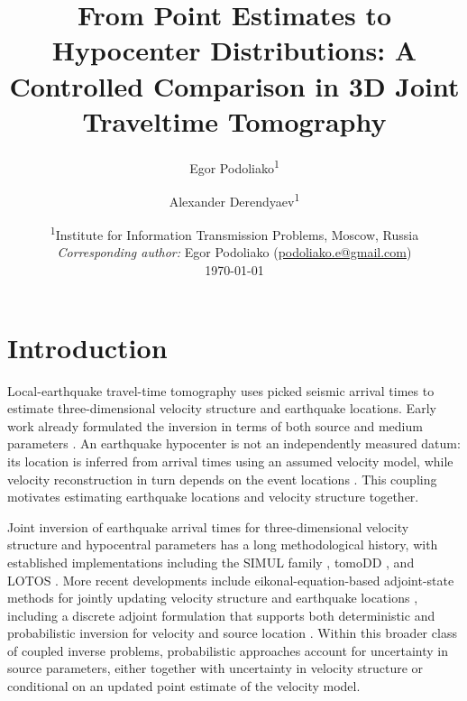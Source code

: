 \documentclass[12pt, a4paper]{article}
\title{
  \Large\textbf{
    From Point Estimates to Hypocenter Distributions: A Controlled Comparison in 3D Joint Traveltime Tomography
  }
}
\author{
  Egor Podoliako\textsuperscript{1} \and
  Alexander Derendyaev\textsuperscript{1}
}
\date{
  \small
  \textsuperscript{1}Institute for Information Transmission Problems, Moscow, Russia \\
  \textit{Corresponding author:} Egor Podoliako
  (\href{mailto:podoliako.e@gmail.com}{podoliako.e@gmail.com}) \\[6pt]
  \today
}
\begin{document}
\maketitle
\thispagestyle{empty}

\newpage

\section{Introduction}
\label{sec:introduction}

Local-earthquake travel-time tomography uses picked seismic arrival times to estimate three-dimensional velocity structure and earthquake locations. Early work already formulated the inversion in terms of both source and medium parameters \parencite{aki1976}. An earthquake hypocenter is not an independently measured datum: its location is inferred from arrival times using an assumed velocity model, while velocity reconstruction in turn depends on the event locations \parencite{thurber1992,kissling1988}. This coupling motivates estimating earthquake locations and velocity structure together.

Joint inversion of earthquake arrival times for three-dimensional velocity structure and hypocentral parameters has a long methodological history, with established implementations including the SIMUL family \parencite{thurber1983}, tomoDD \parencite{zhang2003}, and LOTOS \parencite{koulakov2009}. More recent developments include eikonal-equation-based adjoint-state methods for jointly updating velocity structure and earthquake locations \parencite{tong2024}, including a discrete adjoint formulation that supports both deterministic and probabilistic inversion for velocity and source location \parencite{zunino2025}. Within this broader class of coupled inverse problems, probabilistic approaches account for uncertainty in source parameters, either together with uncertainty in velocity structure or conditional on an updated point estimate of the velocity model.
\end{document}
